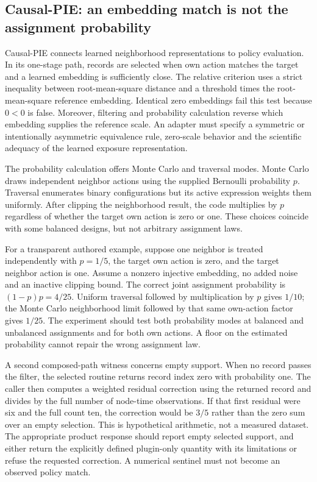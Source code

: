 \subsection{Causal-PIE: an embedding match is not the assignment probability}

Causal-PIE connects learned neighborhood representations to policy evaluation. In its one-stage path, records are selected when own action matches the target and a learned embedding is sufficiently close. The relative criterion uses a strict inequality between root-mean-square distance and a threshold times the root-mean-square reference embedding. Identical zero embeddings fail this test because $0<0$ is false. Moreover, filtering and probability calculation reverse which embedding supplies the reference scale. An adapter must specify a symmetric or intentionally asymmetric equivalence rule, zero-scale behavior and the scientific adequacy of the learned exposure representation.~\citep{exec25_pnet_pie}

The probability calculation offers Monte Carlo and traversal modes. Monte Carlo draws independent neighbor actions using the supplied Bernoulli probability $p$. Traversal enumerates binary configurations but its active expression weights them uniformly. After clipping the neighborhood result, the code multiplies by $p$ regardless of whether the target own action is zero or one. These choices coincide with some balanced designs, but not arbitrary assignment laws.~\citep{exec25_pnet_pie}

For a transparent authored example, suppose one neighbor is treated independently with $p=1/5$, the target own action is zero, and the target neighbor action is one. Assume a nonzero injective embedding, no added noise and an inactive clipping bound. The correct joint assignment probability is $(1-p)p=4/25$. Uniform traversal followed by multiplication by $p$ gives $1/10$; the Monte Carlo neighborhood limit followed by that same own-action factor gives $1/25$. The experiment should test both probability modes at balanced and unbalanced assignments and for both own actions. A floor on the estimated probability cannot repair the wrong assignment law.~\citep{exec25_pnet_choice}

A second composed-path witness concerns empty support. When no record passes the filter, the selected routine returns record index zero with probability one. The caller then computes a weighted residual correction using the returned record and divides by the full number of node-time observations. If that first residual were six and the full count ten, the correction would be $3/5$ rather than the zero sum over an empty selection. This is hypothetical arithmetic, not a measured dataset. The appropriate product response should report empty selected support, and either return the explicitly defined plugin-only quantity with its limitations or refuse the requested correction. A numerical sentinel must not become an observed policy match.~\citep{exec25_pnet_pie,exec25_pnet_choice}

